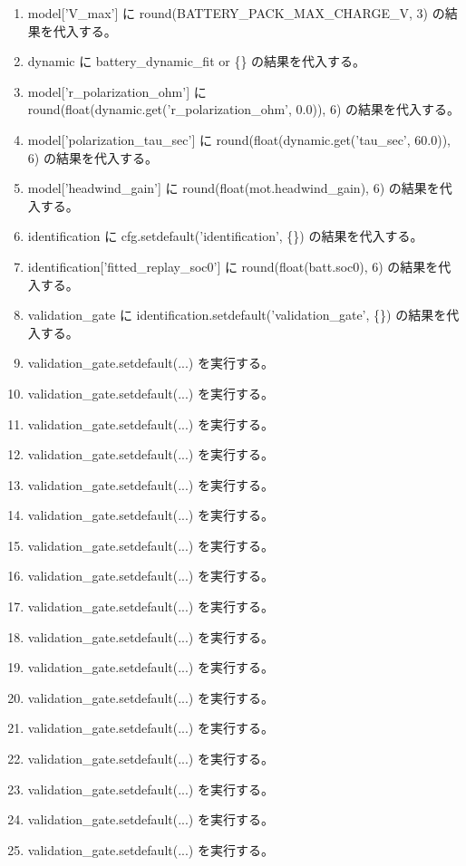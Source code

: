 \documentclass[a4paper,11pt]{article}
\begin{document}
\begin{enumerate}[leftmargin=1.8em]
\item model['V\_max'] に round(BATTERY\_PACK\_MAX\_CHARGE\_V, 3) の結果を代入する。
\item dynamic に battery\_dynamic\_fit or \{\} の結果を代入する。
\item model['r\_polarization\_ohm'] に round(float(dynamic.get('r\_polarization\_ohm', 0.0)), 6) の結果を代入する。
\item model['polarization\_tau\_sec'] に round(float(dynamic.get('tau\_sec', 60.0)), 6) の結果を代入する。
\item model['headwind\_gain'] に round(float(mot.headwind\_gain), 6) の結果を代入する。
\item identification に cfg.setdefault('identification', \{\}) の結果を代入する。
\item identification['fitted\_replay\_soc0'] に round(float(batt.soc0), 6) の結果を代入する。
\item validation\_gate に identification.setdefault('validation\_gate', \{\}) の結果を代入する。
\item validation\_gate.setdefault(...) を実行する。
\item validation\_gate.setdefault(...) を実行する。
\item validation\_gate.setdefault(...) を実行する。
\item validation\_gate.setdefault(...) を実行する。
\item validation\_gate.setdefault(...) を実行する。
\item validation\_gate.setdefault(...) を実行する。
\item validation\_gate.setdefault(...) を実行する。
\item validation\_gate.setdefault(...) を実行する。
\item validation\_gate.setdefault(...) を実行する。
\item validation\_gate.setdefault(...) を実行する。
\item validation\_gate.setdefault(...) を実行する。
\item validation\_gate.setdefault(...) を実行する。
\item validation\_gate.setdefault(...) を実行する。
\item validation\_gate.setdefault(...) を実行する。
\item validation\_gate.setdefault(...) を実行する。
\item validation\_gate.setdefault(...) を実行する。
\item validation\_gate.setdefault(...) を実行する。

\end{enumerate}
\end{document}
